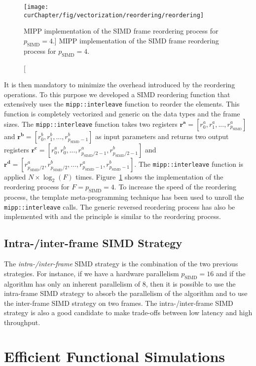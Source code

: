 \begin{figure}[htp]
  \centering
  \texttt{[image: \\curChapter/fig/vectorization/reordering/reordering]}
  \caption
    [MIPP implementation of the SIMD frame reordering process for
     $p_\text{SIMD} = 4$.]
    {MIPP implementation of the SIMD frame reordering process for
     $p_\text{SIMD} = 4$.}
  \label{fig:opt_vec_reordering}
\end{figure}

It is then mandatory to minimize the overhead introduced by the reordering
operations. To this purpose we developed a SIMD reordering function that
extensively uses the \verb|mipp::interleave| function to reorder the elements.
This function is completely vectorized and generic on the data types and the
frame sizes. The \verb|mipp::interleave| function takes two registers $\bm{r^a}
= [r^a_0, r^a_1, ..., r^a_{p_\text{SIMD}}]$ and $\bm{r^b} = [r^b_0, r^b_1,
..., r^b_{p_\text{SIMD}-1}]$ as input parameters and returns two output
registers $\bm{r^c} = [r^a_0, r^b_0, ..., r^a_{p_\text{SIMD}/2-1},
r^b_{p_\text{SIMD}/2-1}]$ and $\bm{r^d} = [r^a_{p_\text{SIMD}/2},
r^b_{p_\text{SIMD}/2}, ..., r^a_{p_\text{SIMD}-1}, r^b_{p_\text{SIMD}-1}]$.
The \verb|mipp::interleave| function is applied $N \times \log_2(F)$ times.
Figure~\ref{fig:opt_vec_reordering} shows the \MIPP implementation of the
reordering process for $F = p_\text{SIMD} = 4$. To increase the speed of the
reordering process, the template meta-programming technique has been used to
unroll the \verb|mipp::interleave| calls. The generic reversed reordering
process has also be implemented with \MIPP and the principle is similar to the
reordering process.

\subsection{Intra-/inter-frame SIMD Strategy}

The \emph{intra-/inter-frame} SIMD strategy is the combination of the two
previous strategies. For instance, if we have a hardware parallelism
$p_\text{SIMD} = 16$ and if the algorithm has only an inherent parallelism of
8, then it is possible to use the intra-frame SIMD strategy to absorb the
parallelism of the algorithm and to use the inter-frame SIMD strategy on two
frames. The intra-/inter-frame SIMD strategy is also a good candidate to make
trade-offs between low latency and high throughput.

\section{Efficient Functional Simulations}
\label{sec:opt_simu}

